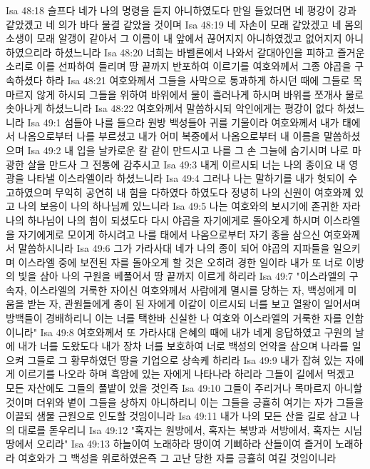 Isa 48:18  슬프다 네가 나의 명령을 듣지 아니하였도다 만일 들었더면 네 평강이 강과 같았겠고 네 의가 바다 물결 같았을 것이며
Isa 48:19  네 자손이 모래 같았겠고 네 몸의 소생이 모래 알갱이 같아서 그 이름이 내 앞에서 끊어지지 아니하였겠고 없어지지 아니하였으리라 하셨느니라
Isa 48:20  너희는 바벨론에서 나와서 갈대아인을 피하고 즐거운 소리로 이를 선파하여 들리며 땅 끝까지 반포하여 이르기를 여호와께서 그종 야곱을 구속하셨다 하라
Isa 48:21  여호와께서 그들을 사막으로 통과하게 하시던 때에 그들로 목마르지 않게 하시되 그들을 위하여 바위에서 물이 흘러나게 하시며 바위를 쪼개사 물로 솟아나게 하셨느니라
Isa 48:22  여호와께서 말씀하시되 악인에게는 평강이 없다 하셨느니라
Isa 49:1  섬들아 나를 들으라 원방 백성들아 귀를 기울이라 여호와께서 내가 태에서 나옴으로부터 나를 부르셨고 내가 어미 복중에서 나옴으로부터 내 이름을 말씀하셨으며
Isa 49:2  내 입을 날카로운 칼 같이 만드시고 나를 그 손 그늘에 숨기시며 나로 마광한 살을 만드사 그 전통에 감추시고
Isa 49:3  내게 이르시되 너는 나의 종이요 내 영광을 나타낼 이스라엘이라 하셨느니라
Isa 49:4  그러나 나는 말하기를 내가 헛되이 수고하였으며 무익히 공연히 내 힘을 다하였다 하였도다 정녕히 나의 신원이 여호와께 있고 나의 보응이 나의 하나님께 있느니라
Isa 49:5  나는 여호와의 보시기에 존귀한 자라 나의 하나님이 나의 힘이 되셨도다 다시 야곱을 자기에게로 돌아오게 하시며 이스라엘을 자기에게로 모이게 하시려고 나를 태에서 나옴으로부터 자기 종을 삼으신 여호와께서 말씀하시니라
Isa 49:6  그가 가라사대 네가 나의 종이 되어 야곱의 지파들을 일으키며 이스라엘 중에 보전된 자를 돌아오게 할 것은 오히려 경한 일이라 내가 또 너로 이방의 빛을 삼아 나의 구원을 베풀어서 땅 끝까지 이르게 하리라
Isa 49:7  "이스라엘의 구속자, 이스라엘의 거룩한 자이신 여호와께서 사람에게 멸시를 당하는 자, 백성에게 미움을 받는 자, 관원들에게 종이 된 자에게 이같이 이르시되 너를 보고 열왕이 일어서며 방백들이 경배하리니 이는 너를 택한바 신실한 나 여호와 이스라엘의 거룩한 자를 인함이니라"
Isa 49:8  여호와께서 또 가라사대 은혜의 때에 내가 네게 응답하였고 구원의 날에 내가 너를 도왔도다 내가 장차 너를 보호하여 너로 백성의 언약을 삼으며 나라를 일으켜 그들로 그 황무하였던 땅을 기업으로 상속케 하리라
Isa 49:9  내가 잡혀 있는 자에게 이르기를 나오라 하며 흑암에 있는 자에게 나타나라 하리라 그들이 길에서 먹겠고 모든 자산에도 그들의 풀밭이 있을 것인즉
Isa 49:10  그들이 주리거나 목마르지 아니할 것이며 더위와 볕이 그들을 상하지 아니하리니 이는 그들을 긍휼히 여기는 자가 그들을 이끌되 샘물 근원으로 인도할 것임이니라
Isa 49:11  내가 나의 모든 산을 길로 삼고 나의 대로를 돋우리니
Isa 49:12  "혹자는 원방에서, 혹자는 북방과 서방에서, 혹자는 시님 땅에서 오리라"
Isa 49:13  하늘이여 노래하라 땅이여 기뻐하라 산들이여 즐거이 노래하라 여호와가 그 백성을 위로하였은즉 그 고난 당한 자를 긍휼히 여길 것임이니라
